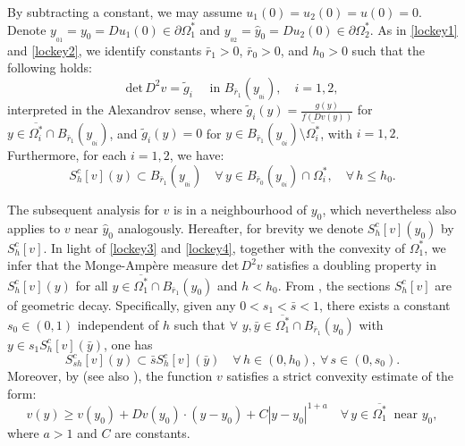 \documentclass[11pt]{amsart}
\theoremstyle{plain}
\renewcommand{\det}{\mbox{det}}
\newcommand{\0}{\textbf{0}}
\numberwithin{equation}{section}
\numberwithin{equation}{section}
\numberwithin{figure}{section}
\begin{document}
By subtracting a constant, we may assume \( u_1(0) = u_2(0) = u(0) = 0. \)
Denote $y_{_{01}} = y_0 = Du_1(0)\in  \partial\Omega^*_1$ and $y_{_{02}} = \hat{y}_0 = Du_2(0)\in  \partial\Omega^*_2$.
As in \eqref{lockey1} and \eqref{lockey2}, we identify constants \(\bar{r}_1 > 0\), \(\bar{r}_0 > 0\), and \(h_0 > 0\) such that the following holds:
\begin{equation}\label{lockey3}
\det\, D^2v = \tilde g_i \quad \text{ in } B_{\bar r_1}(y_{_{0i}}), \quad i = 1,2,
\end{equation}
interpreted in the Alexandrov sense, where $\tilde{g}_i(y) = \frac{g(y)}{f(Dv(y))}$ for $y \in \overline{\Omega_i^*} \cap B_{\bar r_1}(y_{_{0i}})$, and $\tilde{g}_i(y) = 0$ for $y \in B_{\bar r_1}(y_{_{0i}}) \setminus \overline{\Omega_i^*}$, with $i = 1, 2$. Furthermore, for each $i=1,2$, we have:
\begin{equation}\label{lockey4}
S_h^c[v](y) \subset B_{\bar r_1}(y_{_{0i}})  \quad \forall\, y \in B_{\bar r_0}(y_{_{0i}}) \cap \Omega_i^*, \quad \forall\, h \leq h_0.
\end{equation} 

The subsequent analysis for $v$ is in a neighbourhood of $y_0$, which nevertheless also applies to $v$ near $\hat y_0$ analogously. 
Hereafter, for brevity we
denote $S^c_{h}[v](y_0)$ by  $S^c_{h}[v]$. 
In light of \eqref{lockey3} and \eqref{lockey4}, together with the convexity of $\Omega_1^*$, we infer that the Monge-Amp\`ere measure $\det\,D^2v$ satisfies a doubling property in $S_h^c[v](y)$ for all $y\in \overline{\Omega_1^*} \cap B_{\bar r_1}(y_{0})$ and $h < h_0$. 
From \cite[Lemma 2.2]{C96}, the sections $S_h^c[v]$ are of geometric decay. 
Specifically, given any $0 < s_1 < \bar{s} < 1$, there exists a constant $s_0 \in (0,1)$ independent of $h$ such that $\forall$ $y, \bar{y} \in \overline{\Omega_1^*} \cap B_{\bar{r}_1}(y_{0})$ with $y \in s_1 S^c_h[v](\bar{y})$, one has
\begin{equation}\label{geodc}
S^c_{s h}[v](y) \subset \bar{s} S^c_h[v](\bar{y}) \quad \forall\, h \in (0, h_0),\ \forall\, s \in (0, s_0).
\end{equation}
Moreover, by \cite[Corollary 2.3]{C96} (see also \cite[Proof of Theorem 1]{C92b}), the function $v$ satisfies a strict convexity estimate of the form:
\begin{equation}\label{strictconvex}
v(y) \geq v(y_0) + Dv(y_0) \cdot (y - y_0) + C |y - y_0|^{1 + a}  \quad \forall\, y \in \overline{\Omega_1^*} \ \text{ near } y_0,
\end{equation}
where $a > 1$ and $C$ are constants.
\end{document}
